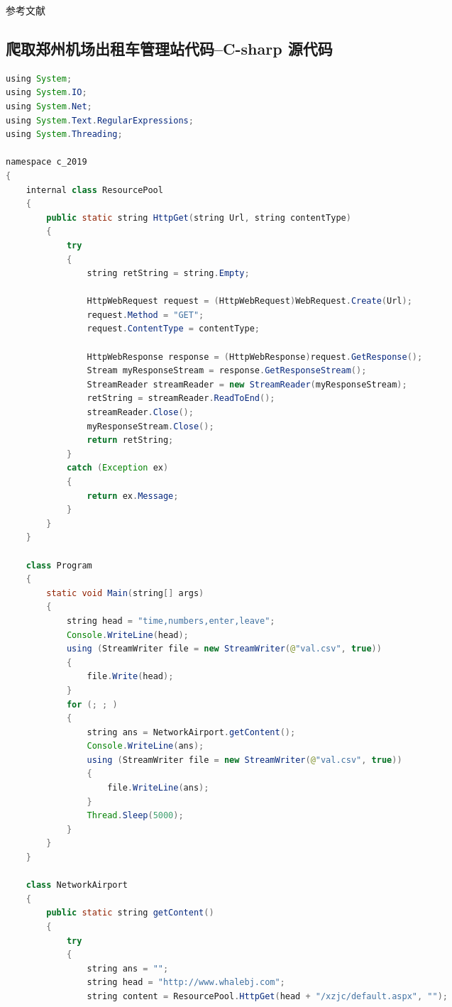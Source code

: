 \documentclass{cumcmthesis}
\begin{document}
\newpage
\begin{thebibliography}{9} %
	 参考文献
\end{thebibliography}

\newpage
\begin{appendices}

	\section{爬取郑州机场出租车管理站代码--C-sharp 源代码}
	\begin{lstlisting}[language=java]
using System;
using System.IO;
using System.Net;
using System.Text.RegularExpressions;
using System.Threading;

namespace c_2019
{
    internal class ResourcePool
    {
        public static string HttpGet(string Url, string contentType)
        {
            try
            {
                string retString = string.Empty;

                HttpWebRequest request = (HttpWebRequest)WebRequest.Create(Url);
                request.Method = "GET";
                request.ContentType = contentType;

                HttpWebResponse response = (HttpWebResponse)request.GetResponse();
                Stream myResponseStream = response.GetResponseStream();
                StreamReader streamReader = new StreamReader(myResponseStream);
                retString = streamReader.ReadToEnd();
                streamReader.Close();
                myResponseStream.Close();
                return retString;
            }
            catch (Exception ex)
            {
                return ex.Message;
            }
        }
    }

    class Program
    {
        static void Main(string[] args)
        {
            string head = "time,numbers,enter,leave";
            Console.WriteLine(head);
            using (StreamWriter file = new StreamWriter(@"val.csv", true))
            {
                file.Write(head);
            }
            for (; ; )
            {
                string ans = NetworkAirport.getContent();
                Console.WriteLine(ans);
                using (StreamWriter file = new StreamWriter(@"val.csv", true))
                {
                    file.WriteLine(ans);
                }
                Thread.Sleep(5000);
            }
        }
    }

    class NetworkAirport
    {
        public static string getContent()
        {
            try
            {
                string ans = "";
                string head = "http://www.whalebj.com";
                string content = ResourcePool.HttpGet(head + "/xzjc/default.aspx", "");


\end{lstlisting}
\end{appendices}
\end{document}
